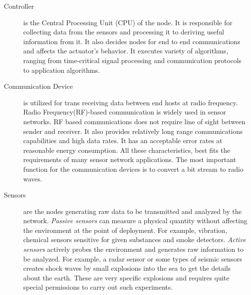 	\begin{description}
	\item[Controller] is the Central Processing Unit (CPU) of the node.
		It is responsible for collecting data from the sensors and processing it to deriving useful information from it. 
		It also decides nodes for end to end communications and affects the actuator's behavior.
		It executes variety of  algorithms, ranging from time-critical signal processing and communication protocols to application algorithms.
	
	\item[Communication Device] is utilized for trans receiving data between end hosts at radio frequency.
		Radio Frequency(RF)-based communication is widely used in sensor networks.
		RF based communications does not require line of sight between sender and receiver.
		It also provides relatively long range communications capabilities and high data rates.
		It has an acceptable error rates at reasonable energy consumption.
		All these characteristics, best fits the requirements of many sensor network applications.
		The most important function for the communication devices is to convert a bit stream to radio waves. 

	\item[Sensors] are the nodes generating raw data to be transmitted and analyzed by the network.
		\textit{Passive sensors} can measure a physical quantity without affecting the environment at the point of deployment. 
		For example, vibration, chemical sensors sensitive for given substances and smoke detectors.
		\textit{Active sensors} actively probes the environment and generates raw information to be analyzed.
		For example, a radar sensor or some types of seismic sensors creates shock waves by small explosions into the sea to get the details about the earth.  
		These are very specific explosions and requires quite special permissions to carry out such experiments.


\end{description}
